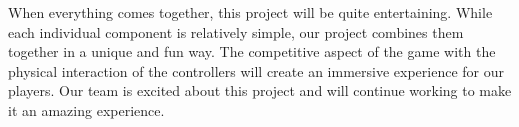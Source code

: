 \documentclass[11pt]{ieeeconf}
\begin{document}
When everything comes together, this project will be quite entertaining. While each individual component is relatively simple, our project combines them together in a unique and fun way. The competitive aspect of the game with the physical interaction of the controllers will create an immersive experience for our players. Our team is excited about this project and will continue working to make it an amazing experience.






\end{document}
